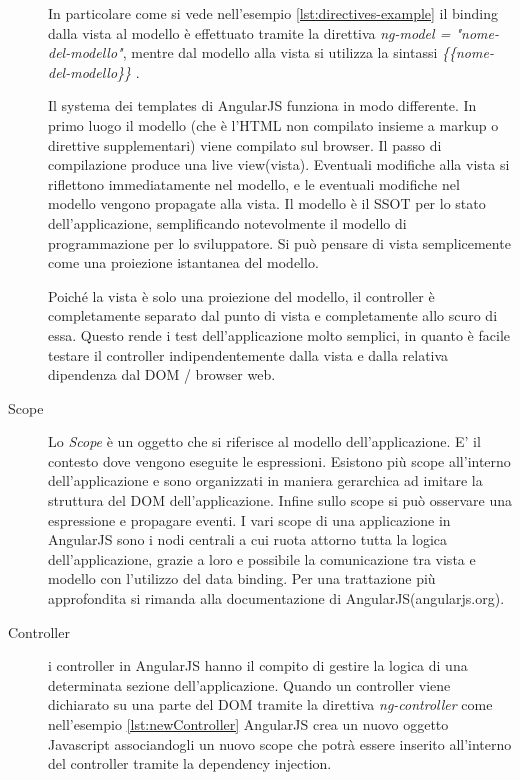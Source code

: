 \begin{description}
In particolare come si vede nell'esempio \ref{lst:directives-example} il binding dalla vista al modello è effettuato tramite la direttiva \emph{ng-model = "nome-del-modello"}, mentre dal modello alla vista si utilizza la sintassi \emph{ \{\{nome-del-modello\}\} }.

Il systema dei templates di AngularJS funziona in modo differente. In primo luogo il modello (che è l'HTML non compilato insieme a  markup o direttive supplementari) viene compilato sul browser. Il passo di compilazione produce una live view(vista). Eventuali modifiche alla vista si riflettono immediatamente nel modello, e le eventuali modifiche nel modello vengono propagate alla vista. Il modello è il SSOT per lo stato dell'applicazione, semplificando notevolmente il modello di programmazione per lo sviluppatore. Si può pensare di vista semplicemente come una proiezione istantanea del modello.

Poiché la vista è solo una proiezione del modello, il controller è completamente separato dal punto di vista e completamente allo scuro di essa. Questo rende i test dell'applicazione molto semplici, in quanto è facile testare il controller indipendentemente dalla vista e dalla relativa dipendenza dal DOM / browser web.

\item[Scope] Lo \emph{Scope} è un oggetto che si riferisce al modello dell'applicazione. E' il contesto dove vengono eseguite le espressioni. Esistono più scope all'interno dell'applicazione e sono organizzati in maniera gerarchica ad imitare la struttura del DOM dell'applicazione. Infine sullo scope si può osservare una espressione e propagare eventi.
I vari scope di una applicazione in AngularJS sono i nodi centrali a cui ruota attorno tutta la logica dell'applicazione, grazie a loro e possibile la comunicazione tra vista e modello con l'utilizzo del data binding. Per una trattazione più approfondita si rimanda alla documentazione di AngularJS(angularjs.org).

\item[Controller] i controller in AngularJS hanno il compito di gestire la logica di una determinata sezione dell'applicazione. Quando un controller viene dichiarato su una parte del DOM tramite la direttiva \emph{ng-controller} come nell'esempio \ref{lst:newController} AngularJS crea un nuovo oggetto Javascript associandogli un nuovo scope che potrà essere inserito all'interno del controller tramite la dependency injection. 


\end{description}
